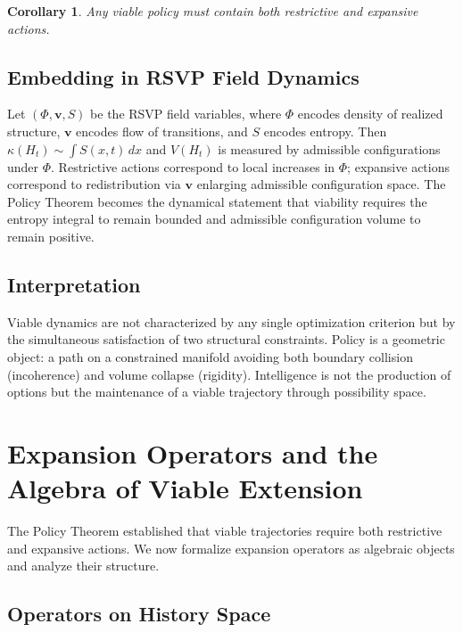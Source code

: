 \documentclass[12pt, a4paper]{article}
\theoremstyle{plain}
\newtheorem{corollary}[theorem]{Corollary}
\theoremstyle{definition}
\theoremstyle{remark}
\begin{document}
\begin{corollary}
Any viable policy must contain both restrictive and expansive actions.
\end{corollary}

\subsection{Embedding in RSVP Field Dynamics}

Let $(\Phi, \mathbf{v}, S)$ be the RSVP field variables, where $\Phi$ encodes density of realized structure, $\mathbf{v}$ encodes flow of transitions, and $S$ encodes entropy. Then $\kappa(H_t) \sim \int S(x,t)\,dx$ and $V(H_t)$ is measured by admissible configurations under $\Phi$. Restrictive actions correspond to local increases in $\Phi$; expansive actions correspond to redistribution via $\mathbf{v}$ enlarging admissible configuration space. The Policy Theorem becomes the dynamical statement that viability requires the entropy integral to remain bounded and admissible configuration volume to remain positive.

\subsection{Interpretation}

Viable dynamics are not characterized by any single optimization criterion but by the simultaneous satisfaction of two structural constraints. Policy is a geometric object: a path on a constrained manifold avoiding both boundary collision (incoherence) and volume collapse (rigidity). Intelligence is not the production of options but the maintenance of a viable trajectory through possibility space.

\section{Expansion Operators and the Algebra of Viable Extension}

The Policy Theorem established that viable trajectories require both restrictive and expansive actions. We now formalize expansion operators as algebraic objects and analyze their structure.

\subsection{Operators on History Space}
\end{document}
